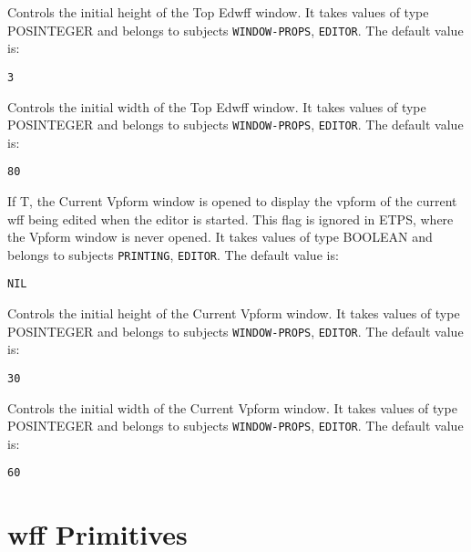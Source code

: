 \begin{description}
\item[EDWIN-TOP-HEIGHT]  
Controls the initial height of the Top Edwff window.
It takes values of type POSINTEGER and belongs to subjects \texttt{WINDOW-PROPS}, \texttt{EDITOR}.  The default value is: \begin{lstlisting}
3
\end{lstlisting}

\item[EDWIN-TOP-WIDTH]  
Controls the initial width of the Top Edwff window.
It takes values of type POSINTEGER and belongs to subjects \texttt{WINDOW-PROPS}, \texttt{EDITOR}.  The default value is: \begin{lstlisting}
80
\end{lstlisting}

\item[EDWIN-VPFORM]  
If T, the Current Vpform window is opened 
   to display the vpform of the current wff being edited 
   when the editor is started. This flag is ignored in ETPS, where
   the Vpform window is never opened.
It takes values of type BOOLEAN and belongs to subjects \texttt{PRINTING}, \texttt{EDITOR}.  The default value is: \begin{lstlisting}
NIL
\end{lstlisting}

\item[EDWIN-VPFORM-HEIGHT]  
Controls the initial height of the Current Vpform window.
It takes values of type POSINTEGER and belongs to subjects \texttt{WINDOW-PROPS}, \texttt{EDITOR}.  The default value is: \begin{lstlisting}
30
\end{lstlisting}

\item[EDWIN-VPFORM-WIDTH]  
Controls the initial width of the Current Vpform window.
It takes values of type POSINTEGER and belongs to subjects \texttt{WINDOW-PROPS}, \texttt{EDITOR}.  The default value is: \begin{lstlisting}
60
\end{lstlisting}

\item
\end{description}

\section{wff Primitives}

